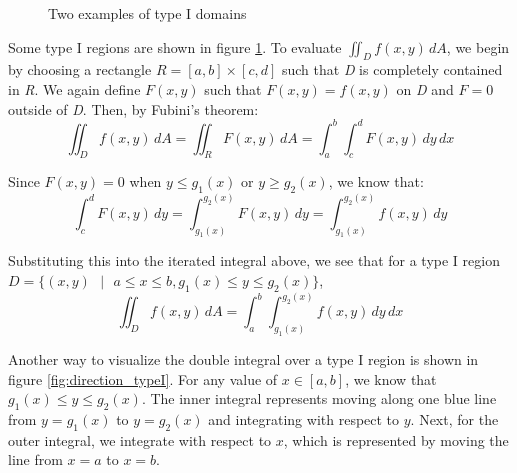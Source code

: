 \begin{figure}[htbp]
    \begin{minipage}{0.5\textwidth}
    \end{minipage}
    \caption{Two examples of type I domains}
    \label{fig:type1}
\end{figure}

Some type I regions are shown in figure \ref{fig:type1}. To evaluate $\iint_{
\textit{D}} f(x,y)\,dA$, we begin by choosing a rectangle $\textit{R} = \left[ 
a, b \right] \times \left[ c, d \right]$ such that \textit{D} is completely 
contained in \textit{R}. We again define $F(x, y)$ such that $F(x, y) = f(x,y)$
on \textit{D} and $F = 0$ outside of \textit{D}. Then, by Fubini's theorem:
$$\iint_{\textit{D}} f(x, y)\,dA = \iint_{\textit{R}} F(x, y)\,dA = \int_a^b 
\int_c^d F(x, y)\,dy\,dx$$

Since $F(x, y) = 0$ when $y \leq g_1(x)$ or $y \geq g_2(x)$, we know that:
$$\int_c^d F(x, y)\,dy = \int_{g_1(x)}^{g_2(x)} F(x, y)\,dy = \int_{g_1(x)}^{
g_2(x)} f(x, y)\,dy$$

Substituting this into the iterated integral above, we see that for a type I 
region $\textit{D} = \{ (x, y) \text{ } | \text{ } a \leq x \leq b, g_1(x) 
\leq y \leq g_2(x) \}$, 
$$\iint_{\textit{D}} f(x, y)\,dA = \int_a^b \int_{g_1(x)}^{g_2(x)} f(x, y)
\,dy\,dx$$

Another way to visualize the double integral over a type I region is shown in 
figure \ref{fig:direction_typeI}. For any value of $x \in \left[ a, b 
\right]$, we know that $g_1(x) \leq y \leq g_2(x)$. The inner integral 
represents moving along one blue line from $y = g_1(x)$ to $y = g_2(x)$ and 
integrating with respect to $y$. Next, for the outer integral, we integrate 
with respect to $x$, which is represented by moving the line from $x = a$ to 
$x = b$. 

